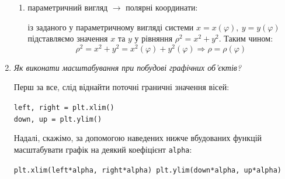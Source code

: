 \documentclass[a4paper,14pt]{extarticle} %
\begin{document}
\begin{enumerate}
\begin{enumerate}
        \item параметричний вигляд $\rightarrow$ полярні координати: \par
        із заданого у параметричному вигляді системи $x=x(\varphi),\ y=y(\varphi)$ підставляємо значення $x$ 
        та $y$ у рівняння $ \rho^2=x^2+y^2 $. Таким чином:
        \[ \rho^2=x^2+y^2=x^2(\varphi)+y^2(\varphi) \Rightarrow \rho=\rho(\varphi) \] 
    \end{enumerate}
    
    \newpage
    \item \textit{Як виконати масштабування при побудові графічних об’єктів?}
    
    Перш за все, слід віднайти поточні граничні значення вісей:
    \begin{center}
        \parbox{7cm}{\texttt{left, right = plt.xlim()\\
        down, up = plt.ylim()}}
    \end{center}
    Надалі, скажімо, за допомогою наведених нижче вбудованих функцій масштабувати графік на деякий
    коефіцієнт \texttt{alpha}:
    \begin{center}
        \parbox{9cm}{\texttt{plt.xlim(left*alpha, right*alpha)
        plt.ylim(down*alpha, up*alpha)}}
    \end{center}

\end{enumerate}
\end{document}
